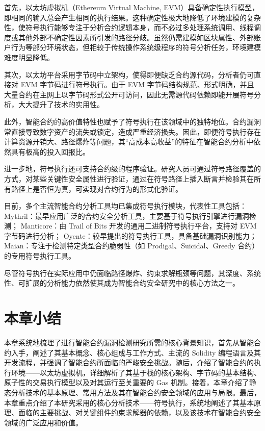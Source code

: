 \documentclass[print, master, vlined, timesmath]{DissertUESTC}
\begin{document}
首先，以太坊虚拟机（Ethereum Virtual Machine, EVM）具备确定性执行模型\cite{}，即相同的输入总会产生相同的执行结果。这种确定性极大地降低了环境建模的复杂性，使符号执行能够专注于分析合约逻辑本身，而不必过多处理系统调用、线程调度或其他外部不确定性因素所引发的路径分歧。虽然仍需建模如区块属性、外部账户行为等部分环境状态\cite{}，但相较于传统操作系统级程序的符号分析任务，环境建模难度明显降低。

其次，以太坊平台采用字节码中立架构，使得即便缺乏合约源代码，分析者仍可直接对 EVM 字节码进行符号执行。由于 EVM 字节码结构规范、形式明确，并且大量合约在主网上以字节码形式公开可访问，因此无需源代码依赖即能开展符号分析，大大提升了技术的实用性。

此外，智能合约的高价值特性也赋予了符号执行在该领域中的独特地位。合约漏洞常直接导致数字资产的流失或锁定，造成严重经济损失。因此，即便符号执行存在计算资源开销大、路径爆炸等问题，其“高成本高收益”的特征在智能合约分析中依然具有极高的投入回报比。


进一步地，符号执行还可支持合约级的程序验证\cite{}。研究人员可通过符号路径覆盖的方式，对某些关键性安全属性进行验证，通过在符号路径上插入断言并检验其在所有路径上是否恒为真，可实现对合约行为的形式化验证。

目前，多个主流智能合约分析工具均已集成符号执行模块，代表性工具包括：
Mythril\cite{}：最早应用广泛的合约安全分析工具，主要基于符号执行引擎进行漏洞检测；
Manticore\cite{}：由 Trail of Bits 开发的通用二进制符号执行平台，支持对 EVM 字节码进行分析；
Oyente\cite{}：较早提出的符号执行工具，具备基础漏洞识别能力；
Maian\cite{}：专注于检测特定类型合约脆弱性（如 Prodigal、Suicidal、Greedy 合约）的专用符号执行工具。

尽管符号执行在实际应用中仍面临路径爆炸、约束求解瓶颈等问题，其深度、系统性、可扩展的分析能力依然使其成为智能合约安全研究中的核心方法之一。
\section{本章小结}
本章系统地梳理了进行智能合约漏洞检测研究所需的核心背景知识，首先从智能合约入手，阐述了其基本概念、核心组成与工作方式、主流的 Solidity 编程语言及其开发流程，并强调了智能合约所面临的严峻安全挑战。随后，介绍了智能合约的执行环境——以太坊虚拟机，详细解析了其基于栈的核心架构、字节码的基本结构、原子性的交易执行模型以及对其运行至关重要的 Gas 机制。接着，本章介绍了静态分析技术的基本原理、常用方法及其在智能合约安全领域的应用与局限。最后，本章重点介绍了本研究采用的核心分析技术——符号执行，系统地阐述了其基本原理、面临的主要挑战、对关键组件约束求解器的依赖，以及该技术在智能合约安全领域的广泛应用和价值。
\end{document}

